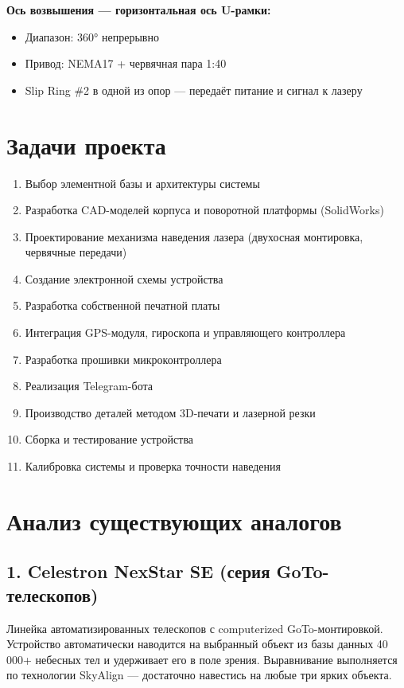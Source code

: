 \documentclass[12pt, a4paper]{article}
\begin{document}
\textbf{Ось возвышения --- горизонтальная ось U-рамки:}
\begin{itemize}[leftmargin=*, nosep]
    \item Диапазон: 360° непрерывно
    \item Привод: NEMA17 + червячная пара 1:40
    \item Slip Ring \#2 в одной из опор --- передаёт питание и сигнал к лазеру
\end{itemize}

\section*{Задачи проекта}

\begin{enumerate}[leftmargin=*, nosep]
    \item Выбор элементной базы и архитектуры системы
    \item Разработка CAD-моделей корпуса и поворотной платформы (SolidWorks)
    \item Проектирование механизма наведения лазера (двухосная монтировка, червячные передачи)
    \item Создание электронной схемы устройства
    \item Разработка собственной печатной платы
    \item Интеграция GPS-модуля, гироскопа и управляющего контроллера
    \item Разработка прошивки микроконтроллера
    \item Реализация Telegram-бота
    \item Производство деталей методом 3D-печати и лазерной резки
    \item Сборка и тестирование устройства
    \item Калибровка системы и проверка точности наведения
\end{enumerate}

\section*{Анализ существующих аналогов}

\subsection*{1. Celestron NexStar SE (серия GoTo-телескопов)}

Линейка автоматизированных телескопов с computerized GoTo-монтировкой. 
Устройство автоматически наводится на выбранный объект из базы данных 
40\,000+ небесных тел и удерживает его в поле зрения. Выравнивание 
выполняется по технологии SkyAlign --- достаточно навестись на любые 
три ярких объекта.
\end{document}
